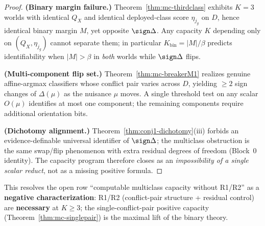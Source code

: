 \begin{proof}
\textbf{(Binary margin failure.)} Theorem~\ref{thm:mc-thirdclass} exhibits $K{=}3$ worlds with
identical $Q_X$ and identical deployed-class score $\eta_{j_g}$ on $D$, hence identical binary
margin $M$, yet opposite $\sign\Delta$. Any capacity $K$ depending only on $(Q_X,\eta_{j_g})$
cannot separate them; in particular $K_{\mathrm{bin}}=|M|/\beta$ predicts identifiability
when $|M|>\beta$ in \emph{both} worlds while $\sign\Delta$ flips.

\textbf{(Multi-component flip set.)} Theorem~\ref{thm:mc-breakerM1} realizes genuine
affine-argmax classifiers whose conflict pair varies across $D$, yielding $\ge2$ sign changes of
$\Delta(\mu)$ as the nuisance $\mu$ moves. A single threshold test on any scalar $O(\mu)$
identifies at most one component; the remaining components require additional orientation bits.

\textbf{(Dichotomy alignment.)} Theorem~\ref{thm:conj1-dichotomy}(iii) forbids an
evidence-definable universal identifier of $\sign\Delta$; the multiclass obstruction is the
same swap/flip phenomenon with extra residual degrees of freedom (Block~0 identity). The
capacity program therefore closes as an \emph{impossibility of a single scalar reduct}, not as
a missing positive formula.
\end{proof}

\begin{remark}[Status]\label{rmk:mc-cap-closed}
This resolves the open row ``computable multiclass capacity without R1/R2'' as a
\textbf{negative characterization}: R1/R2 (conflict-pair structure + residual control) are
\textbf{necessary} at $K\ge3$; the single-conflict-pair positive capacity
(Theorem~\ref{thm:mc-singlepair}) is the maximal lift of the binary theory.
\end{remark}

